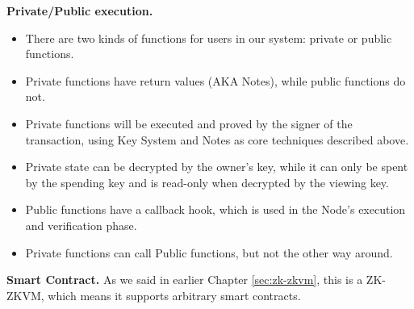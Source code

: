 \textbf{Private/Public execution.}
\begin{itemize}
    \item There are two kinds of functions for users in our system: private or public functions.
    \item Private functions have return values (AKA Notes), while public functions do not.
    \item Private functions will be executed and proved by the signer of the transaction, using Key System and Notes as core techniques described above.
    \item Private state can be decrypted by the owner's key, while it can only be spent by the spending key and is read-only when decrypted by the viewing key.
    \item Public functions have a callback hook, which is used in the Node's execution and verification phase.
    \item Private functions can call Public functions, but not the other way around.
\end{itemize}
\bigskip

\textbf{Smart Contract.} As we said in earlier Chapter \ref{sec:zk-zkvm}, this is a ZK-ZKVM, which means it supports arbitrary smart contracts.